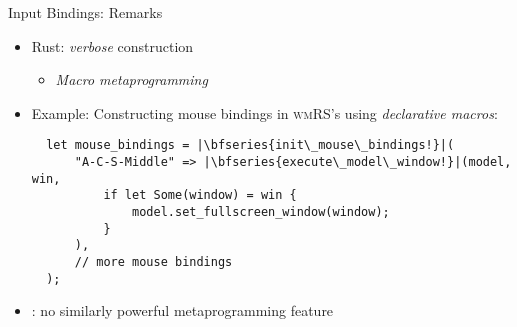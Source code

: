 \begin{frame}[t,fragile]{Input Bindings: Remarks}

    \begin{itemize}
        \itemsep.3em

        \item Rust: \textit{verbose}  construction
            \begin{itemize}
                \item \textit{Macro metaprogramming}
            \end{itemize}

        \item Example: Constructing mouse bindings in \textsc{wmRS}'s using \textit{declarative macros}:\\[3pt]
\begin{verbatim}
  let mouse_bindings = |\bfseries{init\_mouse\_bindings!}|(
      "A-C-S-Middle" => |\bfseries{execute\_model\_window!}|(model, win,
          if let Some(window) = win {
              model.set_fullscreen_window(window);
          }
      ),
      // more mouse bindings
  );
\end{verbatim}

        \item \cpp: no similarly powerful metaprogramming feature

    \end{itemize}

    \vfill

\end{frame}
